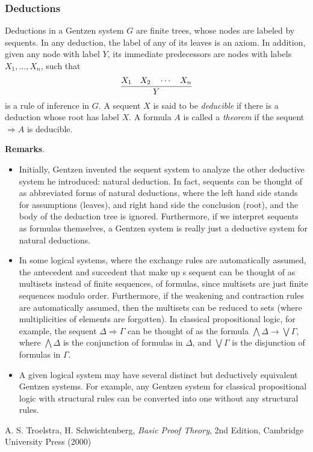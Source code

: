 \documentclass[12pt]{article}
\begin{document}
\subsubsection*{Deductions}

Deductions in a Gentzen system $G$ are finite trees, whose nodes are labeled by sequents.  In any deduction, the label of any of its leaves is an axiom.  In addition, given any node with label $Y$, its immediate predecessors are nodes with labels $X_1,\ldots, X_n$, such that 
$${X_1 \quad X_2 \quad \cdots \quad X_n \over Y}$$
is a rule of inference in $G$.  A sequent $X$ is said to be \emph{deducible} if there is a deduction whose root has label $X$.  A formula $A$ is called a \emph{theorem} if the sequent $\Rightarrow A$ is deducible.

\textbf{Remarks}.
\begin{itemize}
\item Initially, Gentzen invented the sequent system to analyze the other deductive system he introduced: natural deduction.  In fact, sequents can be thought of as abbreviated forms of natural deductions, where the left hand side stands for assumptions (leaves), and right hand side the conclusion (root), and the body of the deduction tree is ignored.  Furthermore, if we interpret sequents as formulas themselves, a Gentzen system is really just a deductive system for natural deductions.
\item In some logical systems, where the exchange rules are automatically assumed, the antecedent and succedent that make up s sequent can be thought of as multisets instead of finite sequences, of formulas, since multisets are just finite sequences modulo order.  Furthermore, if the weakening and contraction rules are automatically assumed, then the multisets can be reduced to sets (where multiplicities of elements are forgotten).  In classical propositional logic, for example, the sequent $\Delta\Rightarrow \Gamma$ can be thought of as the formula $\bigwedge \Delta \to \bigvee \Gamma$, where $\bigwedge \Delta$ is the conjunction of formulas in $\Delta$, and $\bigvee \Gamma$ is the disjunction of formulas in $\Gamma$.
\item A given logical system may have several distinct but deductively equivalent Gentzen systems.  For example, any Gentzen system for classical propositional logic with structural rules can be converted into one without any structural rules.
\end{itemize}

\begin{thebibliography}{7}
 A. S. Troelstra, H. Schwichtenberg, {\it Basic Proof Theory}, 2nd Edition, Cambridge University Press (2000)
\end{thebibliography}

\end{document}
